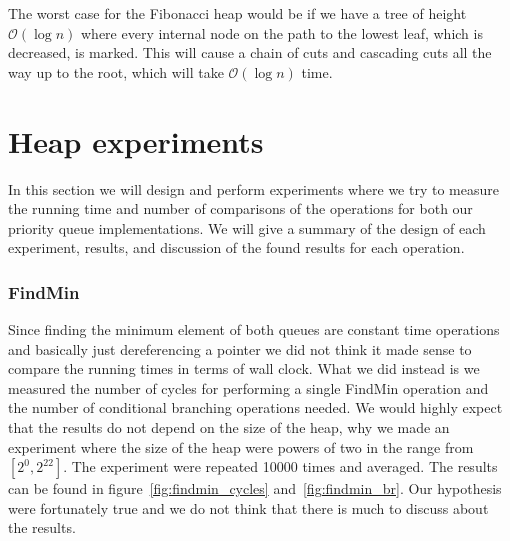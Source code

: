 \documentclass[a4paper,oneside,article,11pt]{memoir}
\begin{document}
The worst case for the Fibonacci heap would be if we have a tree of height $\mathcal{O}(\log n)$ where every internal node on the path to the lowest leaf, which is decreased, is marked. This will cause a chain of cuts and cascading cuts all the way up to the root, which will take $\mathcal{O}(\log n)$ time.

\chapter{Heap experiments}
In this section we will design and perform experiments where we try to measure the running time and number of comparisons of the operations for both our priority queue implementations. We will give a summary of the design of each experiment, results, and discussion of the found results for each operation.

\subsection{FindMin}
Since finding the minimum element of both queues are constant time operations and basically just dereferencing a pointer we did not think it made sense to compare the running times in terms of wall clock. What we did instead is we measured the number of cycles for performing a single FindMin operation and the number of conditional branching operations needed. We would highly expect that the results do not depend on the size of the heap, why we made an experiment where the size of the heap were powers of two in the range from $\left[2^0, 2^{22}\right]$. The experiment were repeated 10000 times and averaged. The results can be found in figure~\ref{fig:findmin_cycles} and~\ref{fig:findmin_br}.
Our hypothesis were fortunately true and we do not think that there is much to discuss about the results.
\end{document}

